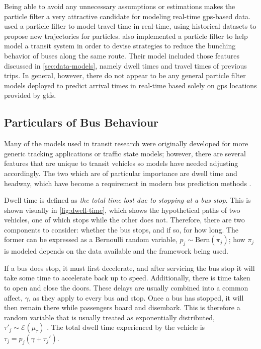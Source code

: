 \documentclass[12pt,a4paper]{article}
\newcommand{\pf}{particle filter}
\begin{document}
Being able to avoid any unnecessary assumptions or estimations makes the
\pf{} a very attractive candidate for modeling real-time \gls{gps}-based data.
\cite{chen-rakha:2014} used a \pf{} to model travel time in real-time,
using historical datasets to propose new trajectories for particles.
\cite{hans-etal:2015} also implemented a \pf{} to help model a transit system
in order to devise strategies
to reduce the bunching behavior of buses along the same route.
Their model included those features discussed in \cref{sec:data-models},
namely dwell times and travel times of previous trips.
In general, however, there do not appear to be any general \pf{} models deployed
to predict arrival times in real-time based solely on \gls{gps} locations provided
by \gls{gtfs}.



\subsection{Particulars of Bus Behaviour}
\label{sec:bus-behaviour}

Many of the models used in transit research were originally developed for 
more generic tracking applications or traffic state models;
however, there are several features that are unique to transit vehicles
so models have needed adjusting accordingly.
The two which are of particular importance are dwell time and headway,
which have become a requirement in modern bus prediction methods
\citep{cn}.


Dwell time is defined as \emph{the total time lost due to stopping at a bus stop}.
This is shown visually in \cref{fig:dwell-time},
which shows the hypothetical paths of two vehicles, one of which stops while the other does not.
Therefore, there are two components to consider:
whether the bus stops, and if so, for how long.
The former can be expressed as a Bernoulli random variable, $p_j \sim \mathrm{Bern}(\pi_j)$;
how $\pi_j$ is modeled depends on the data available and the framework being used.


If a bus does stop, it must first decelerate,
and after servicing the bus stop it will take some time to accelerate back up to speed.
Additionally, there is time taken to open and close the doors.
These delays are usually combined into a common affect, $\gamma$,
as they apply to every bus and stop.
Once a bus has stopped, it will then remain there while passengers board and disembark.
This is therefore a random variable that is usually treated as exponentially distributed,
$\tau'_j \sim \mathcal{E}(\mu_\tau)$
\citep{cn}.
The total dwell time experienced by the vehicle is $\tau_j = p_j(\gamma + \tau_j')$.
\end{document}
